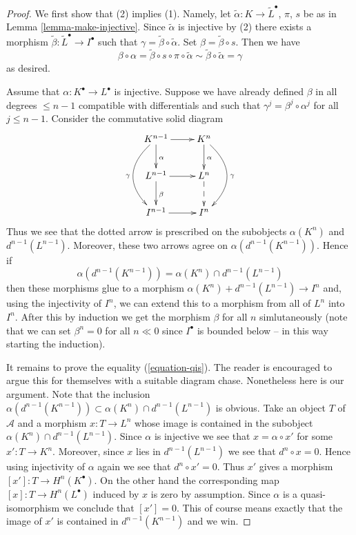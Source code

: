 \begin{proof}
We first show that (2) implies (1). Namely, let
$\tilde \alpha : K \to \tilde L^\bullet$, $\pi$, $s$ be as in
Lemma \ref{lemma-make-injective}. Since $\tilde \alpha$ is injective
by (2) there exists a morphism $\tilde \beta : \tilde L^\bullet \to I^\bullet$
such that $\gamma = \tilde \beta \circ \tilde \alpha$. Set
$\beta = \tilde \beta \circ s$. Then we have
$$
\beta \circ \alpha
=
\tilde \beta \circ s \circ \pi \circ \tilde \alpha
\sim
\tilde \beta \circ \tilde \alpha
=
\gamma
$$
as desired.

\medskip\noindent
Assume that $\alpha : K^\bullet \to L^\bullet$ is injective.
Suppose we have already defined $\beta$ in all degrees
$\leq n - 1$ compatible with differentials and such that
$\gamma^j = \beta^j \circ \alpha^j$ for all $j \leq n - 1$.
Consider the commutative solid diagram
$$
\xymatrix{
K^{n - 1} \ar[r] \ar@/_2pc/[dd]_\gamma \ar[d]^\alpha &
K^n \ar@/^2pc/[dd]^\gamma \ar[d]^\alpha \\
L^{n - 1} \ar[r] \ar[d]^\beta &
L^n \ar@{-->}[d] \\
I^{n - 1} \ar[r] &
I^n
}
$$
Thus we see that the dotted arrow is prescribed on the subobjects
$\alpha(K^n)$ and $d^{n - 1}(L^{n - 1})$. Moreover, these two arrows
agree on $\alpha(d^{n - 1}(K^{n - 1}))$. Hence if
\begin{equation}
\label{equation-qis}
\alpha(d^{n - 1}(K^{n - 1}))
=
\alpha(K^n) \cap d^{n - 1}(L^{n - 1})
\end{equation}
then these morphisms glue to a morphism
$\alpha(K^n) + d^{n - 1}(L^{n - 1}) \to I^n$ and, using the injectivity
of $I^n$, we can extend this to a morphism from all of $L^n$ into $I^n$.
After this by induction we get the morphism $\beta$ for all $n$ simlutaneously
(note that we can set $\beta^n = 0$ for all $n \ll 0$ since $I^\bullet$
is bounded below -- in this way starting the induction).

\medskip\noindent
It remains to prove the equality (\ref{equation-qis}).
The reader is encouraged to argue this for themselves with a suitable
diagram chase. Nonetheless here is our argument.
Note that the inclusion
$\alpha(d^{n - 1}(K^{n - 1})) \subset \alpha(K^n) \cap d^{n - 1}(L^{n - 1})$
is obvious. Take an object $T$ of $\mathcal{A}$ and a morphism
$x : T \to L^n$ whose image is contained in the subobject
$\alpha(K^n) \cap d^{n - 1}(L^{n - 1})$.
Since $\alpha$ is injective we see that $x = \alpha \circ x'$ for
some $x' : T \to K^n$. Moreover, since $x$ lies in $d^{n - 1}(L^{n - 1})$
we see that $d^n \circ x = 0$. Hence using injectivity of $\alpha$ again
we see that $d^n \circ x' = 0$. Thus $x'$ gives a morphism
$[x'] : T \to H^n(K^\bullet)$. On the other hand the corresponding
map $[x] : T \to H^n(L^\bullet)$ induced by $x$ is zero by assumption.
Since $\alpha$ is a quasi-isomorphism we conclude that $[x'] = 0$.
This of course means exactly that the image of $x'$ is
contained in $d^{n - 1}(K^{n - 1})$ and we win.
\end{proof}

